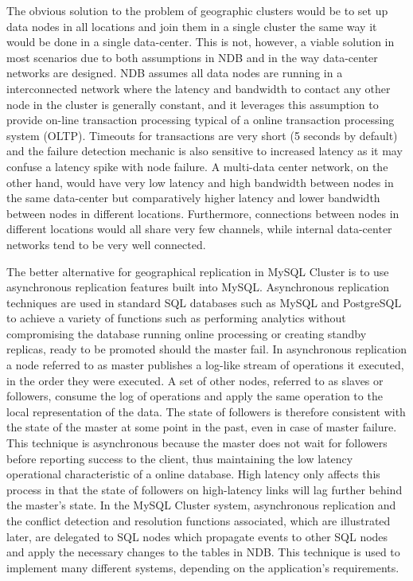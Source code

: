 The obvious solution to the problem of geographic clusters would be to set up data nodes in all locations and join them in a single cluster the same way it would be done in a single data-center.
This is not, however, a viable solution in most scenarios due to both assumptions in NDB and in the way data-center networks are designed.
NDB assumes all data nodes are running in a interconnected network where the latency and bandwidth to contact any other node in the cluster is generally constant, and it leverages this assumption to provide on-line transaction processing typical of a online transaction processing system (OLTP).
Timeouts for transactions are very short (5 seconds by default) and the failure detection mechanic is also sensitive to increased latency as it may confuse a latency spike with node failure.
A multi-data center network, on the other hand, would have very low latency and high bandwidth between nodes in the same data-center but comparatively higher latency and lower bandwidth between nodes in different locations.
Furthermore, connections between nodes in different locations would all share very few channels, while internal data-center networks tend to be very well connected.

The better alternative for geographical replication in MySQL Cluster is to use asynchronous replication features built into MySQL.
Asynchronous replication techniques are used in standard SQL databases such as MySQL and PostgreSQL to achieve a variety of functions such as performing analytics without compromising the database running online processing or creating standby replicas, ready to be promoted should the master fail.
In asynchronous replication a node referred to as master publishes a log-like stream of operations it executed, in the order they were executed.
A set of other nodes, referred to as slaves or followers, consume the log of operations and apply the same operation to the local representation of the data.
The state of followers is therefore consistent with the state of the master at some point in the past, even in case of master failure.
This technique is asynchronous because the master does not wait for followers before reporting success to the client, thus maintaining the low latency operational characteristic of a online database.
High latency only affects this process in that the state of followers on high-latency links will lag further behind the master's state.
In the MySQL Cluster system, asynchronous replication and the conflict detection and resolution functions associated, which are illustrated later, are delegated to SQL nodes which propagate events to other SQL nodes and apply the necessary changes to the tables in NDB.
This technique is used to implement many different systems, depending on the application's requirements.

